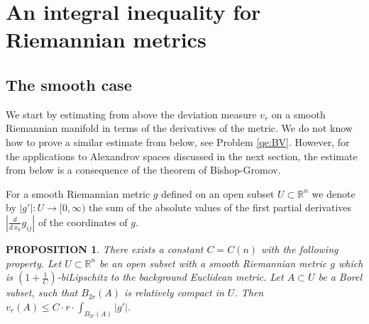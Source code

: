 \documentclass[12pt,leqno]{amsart}
\numberwithin{equation}{section}
\newtheorem{prop}[thm]{PROPOSITION}
\theoremstyle{definition}
\newtheorem{defn}[thm]{Definition}%
\theoremstyle{remark}
\newcommand{\R}{\mathbb{R}}
\def\:{\colon}
\begin{document}






\section{An integral inequality for Riemannian metrics}\label{sec-BV-estimate}
\subsection{The smooth case} We start by estimating from above the deviation measure $v_r$  on a smooth Riemannian manifold in terms of the
derivatives of the metric.  We do not know how to prove a similar estimate from below, see  Problem \ref{qe:BV}. However, for the applications
to Alexandrov spaces discussed in the next section, the  estimate from below is a consequence of the theorem of Bishop-Gromov.

For a smooth Riemannian metric $g$ defined on an open subset $U\subset \R^n$ we denote by $|g'|:U\to [0,\infty)$ the sum of the absolute values of the first partial  derivatives $|\frac d {d\,x_k} g_{ij}|$ of the coordinates  of $g$.

\begin{prop}\label{prop-smooth}
There exists a constant $C=C(n)$ with the following property.
Let $U\subset \R^n$ be an open subset with a smooth Riemannian
metric $g$ which is $(1+\frac 1 C)$-biLipschitz to  the background Euclidean metric.
  Let $A\subset U$ be a Borel subset, such that $B_{2r} (A)$ is relatively compact in $U$.
Then  $v_r (A) \leq C \cdot r \cdot \int _{B_{2r} ( A)} |g' |$.
\end{prop}
\end{document}
